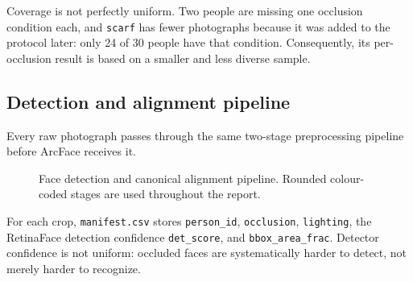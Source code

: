 \documentclass[11pt,a4paper]{article}
\newcommand{\code}[1]{\texttt{#1}}
\begin{document}
Coverage is not perfectly uniform. Two people are missing one occlusion condition each, and \code{scarf} has fewer photographs because it was added to the protocol later: only 24 of 30 people have that condition. Consequently, its per-occlusion result is based on a smaller and less diverse sample.

\subsection{Detection and alignment pipeline}

Every raw photograph passes through the same two-stage preprocessing pipeline before ArcFace receives it.

\begin{figure}[H]
\centering
{}
\caption{Face detection and canonical alignment pipeline. Rounded colour-coded stages are used throughout the report.}
\label{fig:preprocess}
\end{figure}

For each crop, \code{manifest.csv} stores \code{person\_id}, \code{occlusion}, \code{lighting}, the RetinaFace detection confidence \code{det\_score}, and \code{bbox\_area\_frac}. Detector confidence is not uniform: occluded faces are systematically harder to detect, not merely harder to recognize.
\end{document}
